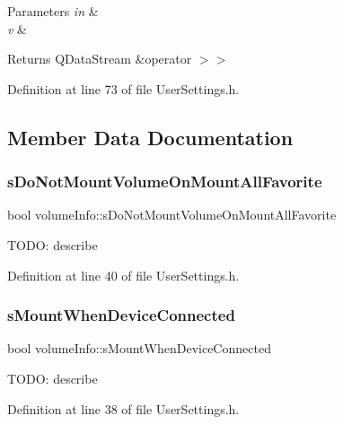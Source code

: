 \begin{DoxyParams}{Parameters}
{\em in} & \\
\hline
{\em v} & \\
\hline
\end{DoxyParams}
\begin{DoxyReturn}{Returns}
Q\+Data\+Stream \&operator $>$$>$ 
\end{DoxyReturn}


Definition at line 73 of file User\+Settings.\+h.



\subsection{Member Data Documentation}
\mbox{\label{structvolume_info_a4414e1d653028a9be3121f49f01e9cd6}} 
\subsubsection{\texorpdfstring{s\+Do\+Not\+Mount\+Volume\+On\+Mount\+All\+Favorite}{sDoNotMountVolumeOnMountAllFavorite}}
{\footnotesize\ttfamily bool volume\+Info\+::s\+Do\+Not\+Mount\+Volume\+On\+Mount\+All\+Favorite}

T\+O\+DO\+: describe 

Definition at line 40 of file User\+Settings.\+h.

\mbox{\label{structvolume_info_aff29d1ee5b61dd4e208c78cf7c6e5570}} 
\subsubsection{\texorpdfstring{s\+Mount\+When\+Device\+Connected}{sMountWhenDeviceConnected}}
{\footnotesize\ttfamily bool volume\+Info\+::s\+Mount\+When\+Device\+Connected}

T\+O\+DO\+: describe 

Definition at line 38 of file User\+Settings.\+h.


